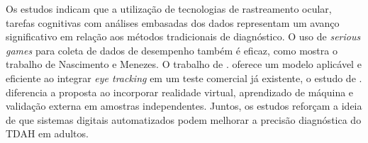 Os estudos indicam que a utilização de tecnologias de rastreamento ocular, tarefas
cognitivas com análises embasadas dos dados representam um avanço significativo em
relação aos métodos tradicionais de diagnóstico. O uso de \textit{serious games} para coleta de
dados de desempenho também é eficaz, como mostra o trabalho de Nascimento e Menezes.
O trabalho de \textcite{Elbaum2020}. oferece um modelo aplicável e eficiente ao integrar \textit{eye tracking}
em um teste comercial já existente, o estudo de \textcite{Wiebe2024}. diferencia a proposta ao
incorporar realidade virtual, aprendizado de máquina e validação externa em amostras
independentes. Juntos, os estudos reforçam a ideia de que sistemas digitais automatizados
podem melhorar a precisão diagnóstica do TDAH em adultos.

